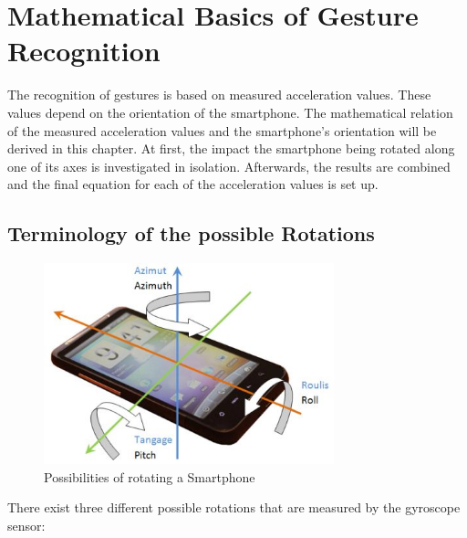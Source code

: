 \documentclass[12pt, a4paper, oneside, british]{article}
\begin{document}
\onehalfspacing
\setlength\epigraphrule{0pt}
\setlength{\epigraphwidth}{0.8\textwidth}
\renewcommand{\epigraphflush}{flushleft}


\setcounter{page}{1}

\section{Mathematical Basics of Gesture Recognition}
The recognition of gestures is based on measured acceleration values. These
values depend on
the orientation of the smartphone. The mathematical relation of the measured
acceleration values and the smartphone's orientation will be derived in this
chapter. At first, the impact the smartphone being rotated along one of its axes
is investigated in isolation. Afterwards, the results are combined and the final
equation for each of the acceleration values is set up.

\subsection{Terminology of the possible Rotations}

\begin{figure}
\centering
\captionsetup{justification=centering}
\includegraphics[width=0.75\textwidth]{res/mathstuff/rotations.jpg}
\caption{Possibilities of rotating a Smartphone\protect\footnotemark}
\label{fig:DataModel}
\end{figure}

There exist three different possible rotations that are measured by the gyroscope sensor:
\end{document}
